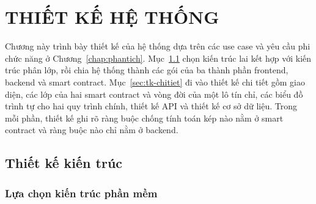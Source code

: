 %

\chapter{THIẾT KẾ HỆ THỐNG}
\label{chap:thietke}


Chương này trình bày thiết kế của hệ thống dựa trên các use case và yêu cầu phi chức năng ở Chương~\ref{chap:phantich}. Mục~\ref{sec:tk-kientruc} chọn kiến trúc lai kết hợp với kiến trúc phân lớp, rồi chia hệ thống thành các gói của ba thành phần frontend, backend và smart contract. Mục~\ref{sec:tk-chitiet} đi vào thiết kế chi tiết gồm giao diện, các lớp của hai smart contract và vòng đời của một lô tín chỉ, các biểu đồ trình tự cho hai quy trình chính, thiết kế API và thiết kế cơ sở dữ liệu. Trong mỗi phần, thiết kế ghi rõ ràng buộc chống tính toán kép nào nằm ở smart contract và ràng buộc nào chỉ nằm ở backend.

\section{Thiết kế kiến trúc}
\label{sec:tk-kientruc}

\subsection*{Lựa chọn kiến trúc phần mềm}
\label{sec:kientruc}

